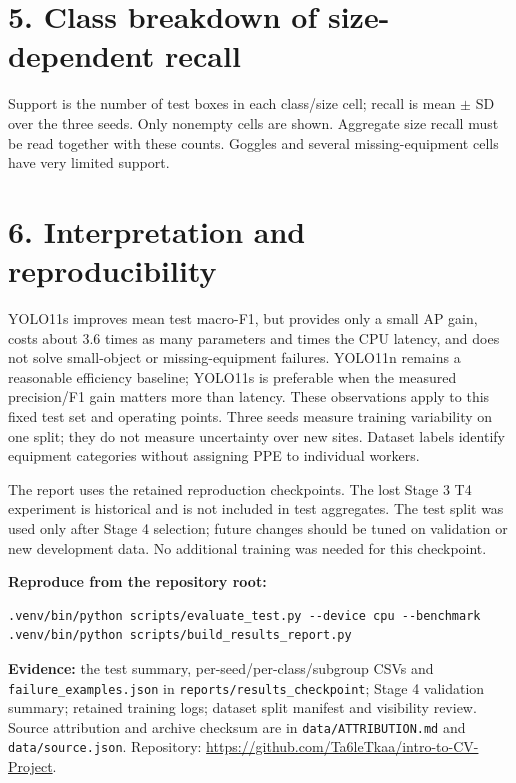 \documentclass[10pt,a4paper]{article}
\begin{document}
\section*{5. Class breakdown of size-dependent recall}
\begin{center}\small\end{center}
Support is the number of test boxes in each class/size cell; recall is mean $\pm$ SD over the three seeds. Only nonempty cells are shown. Aggregate size recall must be read together with these counts. Goggles and several missing-equipment cells have very limited support.
\section*{6. Interpretation and reproducibility}
YOLO11s improves mean test macro-F1, but provides only a small AP gain, costs about 3.6 times as many parameters and \LatencyRatio{} times the CPU latency, and does not solve small-object or missing-equipment failures. YOLO11n remains a reasonable efficiency baseline; YOLO11s is preferable when the measured precision/F1 gain matters more than latency. These observations apply to this fixed test set and operating points. Three seeds measure training variability on one split; they do not measure uncertainty over new sites. Dataset labels identify equipment categories without assigning PPE to individual workers.

The report uses the retained reproduction checkpoints. The lost Stage 3 T4 experiment is historical and is not included in test aggregates. The test split was used only after Stage 4 selection; future changes should be tuned on validation or new development data. No additional training was needed for this checkpoint.

\textbf{Reproduce from the repository root:}
\begin{verbatim}
.venv/bin/python scripts/evaluate_test.py --device cpu --benchmark
.venv/bin/python scripts/build_results_report.py
\end{verbatim}

{\raggedright\textbf{Evidence:} the test summary, per-seed/per-class/subgroup CSVs and \texttt{failure\_examples.json} in \texttt{reports/results\_checkpoint}; Stage 4 validation summary; retained training logs; dataset split manifest and visibility review. Source attribution and archive checksum are in \texttt{data/ATTRIBUTION.md} and \texttt{data/source.json}. Repository: \url{https://github.com/Ta6leTkaa/intro-to-CV-Project}.\par}
\end{document}
